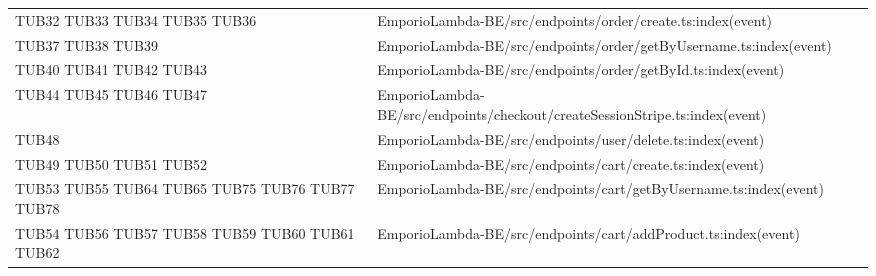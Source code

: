 {\begin{longtable}{C{2cm} C{12.8cm}}
TUB32 \newline TUB33 \newline TUB34 \newline TUB35 \newline TUB36 & EmporioLambda-BE/src/endpoints/order/create.ts:index(event)\\

TUB37 \newline TUB38 \newline TUB39 & EmporioLambda-BE/src/endpoints/order/getByUsername.ts:index(event)\\

TUB40 \newline TUB41 \newline TUB42 \newline TUB43 & EmporioLambda-BE/src/endpoints/order/getById.ts:index(event)\\

TUB44 \newline TUB45 \newline TUB46 \newline TUB47 & EmporioLambda-BE/src/endpoints/checkout/createSessionStripe.ts:index(event)\\

TUB48 & EmporioLambda-BE/src/endpoints/user/delete.ts:index(event)\\

TUB49 \newline TUB50 \newline TUB51 \newline TUB52 & EmporioLambda-BE/src/endpoints/cart/create.ts:index(event)\\

TUB53 \newline TUB55 \newline TUB64 \newline TUB65 \newline TUB75 \newline TUB76 \newline TUB77 \newline TUB78 & EmporioLambda-BE/src/endpoints/cart/getByUsername.ts:index(event)\\

TUB54 \newline TUB56 \newline TUB57 \newline TUB58 \newline TUB59 \newline TUB60 \newline TUB61 \newline TUB62 & EmporioLambda-BE/src/endpoints/cart/addProduct.ts:index(event)\\


\end{longtable}}
